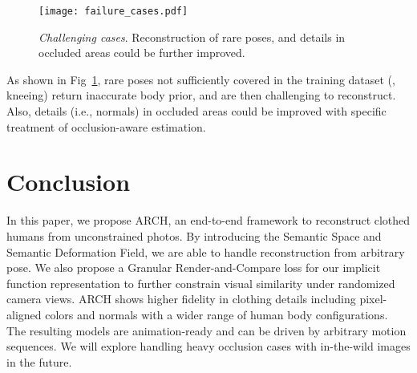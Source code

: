 \documentclass[10pt,twocolumn,letterpaper]{article}
\newcommand{\beforefigcaption}{\vspace{-4mm}}
\newcommand{\afterfigcaption}{\vspace{-4mm}}
\newcommand{\beforesection}{\vspace{-1mm}}
\newcommand{\aftersection}{\vspace{-1mm}}
\begin{document}
\begin{figure}[ptb]
\centering
\texttt{[image: failure\_cases.pdf]}
\beforefigcaption
\vspace{3mm}
\caption{\textit{Challenging cases}. Reconstruction of rare poses, and details in occluded areas could be further improved.}
\afterfigcaption
\label{fig:fail}
\end{figure}

As shown in Fig~\ref{fig:fail}, rare poses not sufficiently covered in the training dataset (\eg, kneeing) return inaccurate body prior, and are then challenging to reconstruct.
Also, details (i.e., normals) in occluded areas could be improved with specific treatment of occlusion-aware estimation. 


\beforesection
\section{Conclusion} \label{sec:conclusion}
\aftersection

In this paper, we propose ARCH, an end-to-end framework to reconstruct clothed humans from unconstrained photos. By introducing the Semantic Space and Semantic Deformation Field, we are able to handle reconstruction from arbitrary pose. We also propose a Granular Render-and-Compare loss for our implicit function representation to further constrain visual similarity under randomized camera views.
ARCH shows higher fidelity in clothing details including pixel-aligned colors and normals with a wider range of human body configurations. The resulting models are animation-ready and can be driven by arbitrary motion sequences. 
We will explore handling heavy occlusion cases with in-the-wild images in the future.\\



{\small


}
\end{document}
